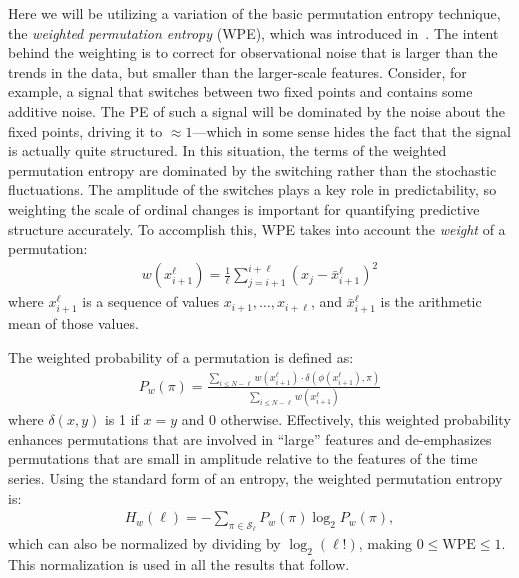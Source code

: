 \documentclass[%
pre,
reprint,
superscriptaddress,
showpacs,
nofootinbib,
nobibnotes,
 amsmath,amssymb,
 aps,
]{revtex4-1}
\begin{document}
Here we will be utilizing a variation of the basic permutation entropy
technique, the \emph{weighted permutation entropy} (WPE), which was
introduced in~\cite{fadlallah2013}.  The intent behind the weighting
is to correct for observational noise that is larger than the trends
in the data, but smaller than the larger-scale features.  Consider,
for example, a signal that switches between two fixed points and
contains some additive noise. The PE of such a signal will be
dominated by the noise about the fixed points, driving it to $\approx
1$---which in some sense hides the fact that the signal is actually
quite structured.  In this situation, the terms of the weighted
permutation entropy are dominated by the switching rather than the
stochastic fluctuations.  The amplitude of the switches plays a key
role in predictability, so weighting the scale of ordinal changes is
important for quantifying predictive structure accurately.  To
accomplish this, WPE takes into account the \emph{weight} of a
permutation:
\begin{align*}
  w(x_{i+1}^\ell) = \frac{1}{\ell} \sum_{j = i + 1}^{i+\ell}
                      \left( x_j - \bar{x}_{i+1}^\ell \right)^2
\end{align*}
where $x_{i+1}^\ell$ is a sequence of values $x_{i+1}, \ldots,
x_{i+\ell}$, and $\bar{x}_{i+1}^\ell$ is the arithmetic mean of
those values.

The weighted probability of a permutation is defined as:
\begin{align*}
  P_w(\pi) = \frac{\displaystyle \sum_{i \le N - \ell} w(x_{i+1}^\ell) \cdot \delta(\phi(x_{i+1}^\ell), \pi) }{\displaystyle \sum_{i \le N - \ell} w(x_{i+1}^\ell)}
\end{align*}
where $\delta(x, y)$ is 1 if $x = y$ and 0 otherwise. Effectively,
this weighted probability enhances permutations that are involved in
``large'' features and de-emphasizes permutations that are small in
amplitude relative to the features of the time series. Using the
standard form of an entropy, the weighted permutation entropy is:
\begin{align*}
  H_w(\ell) = - \sum_{\pi \in \mathcal{S}_\ell} P_w(\pi) \log_2 P_w(\pi),
\end{align*}
which can also be normalized by dividing by $\log_2(\ell!)$, making $0
\le \textrm{WPE} \le 1$.  This normalization is used in all the
results that follow.
\end{document}
